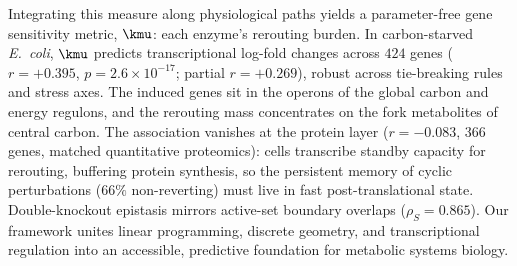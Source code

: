 Integrating this measure along physiological paths yields a
parameter-free gene sensitivity metric, $\kmu$: each enzyme's
rerouting burden. In carbon-starved \emph{E.~coli}, $\kmu$
predicts transcriptional log-fold changes across $424$ genes
($r = +0.395$, $p = 2.6 \times 10^{-17}$; partial $r = +0.269$),
robust across tie-breaking rules and stress axes. The induced
genes sit in the operons of the global carbon and energy regulons,
and the rerouting mass concentrates on the fork metabolites of
central carbon. The association vanishes at the protein layer
($r = -0.083$, $366$ genes, matched quantitative proteomics):
cells transcribe standby capacity for rerouting, buffering protein
synthesis, so the persistent memory of cyclic perturbations
($66\%$ non-reverting) must live in fast post-translational state.
Double-knockout epistasis mirrors active-set boundary overlaps
($\rho_S = 0.865$). Our framework unites linear programming,
discrete geometry, and transcriptional regulation into an
accessible, predictive foundation for metabolic systems biology.
